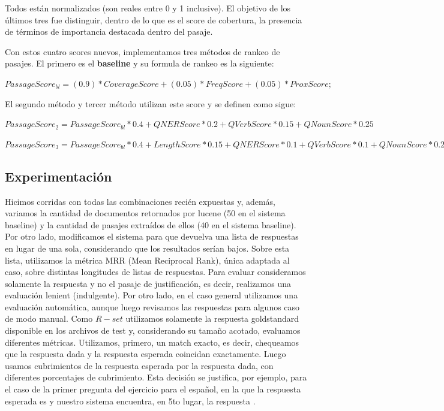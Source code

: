 Todos están normalizados (son reales entre 0 y 1 inclusive). El objetivo de los últimos tres fue distinguir, dentro de lo que es el score de cobertura, la presencia de términos de importancia destacada dentro del pasaje.


Con estos cuatro scores nuevos, implementamos tres métodos de rankeo de pasajes. El primero es el \textbf{baseline} y su formula de rankeo es la siguiente: \newline

$PassageScore_{bl} = (0.9)*CoverageScore + (0.05)*FreqScore+ (0.05)*ProxScore;$ \newline

El segundo método y tercer método utilizan este score y se definen como sigue:\newline

$PassageScore_2 =  PassageScore_{bl} * 0.4 + QNERScore * 0.2 + QVerbScore*0.15	+ QNounScore * 0.25 $\newline

$PassageScore_3 =  PassageScore_{bl} * 0.4 + LengthScore * 0.15 + QNERScore * 0.1 + QVerbScore*0.1	+ QNounScore * 0.25 $\newline


\subsection{Experimentación}
\label{sec:eval}

Hicimos corridas con todas las combinaciones recién expuestas y, además, variamos la cantidad de documentos retornados por lucene (50 en el sistema baseline) y la cantidad de pasajes extraídos de ellos (40 en el sistema baseline).  Por otro lado, modificamos el sistema para que devuelva una lista de respuestas en lugar de una sola, considerando que los resultados serían bajos. Sobre esta lista, utilizamos la métrica MRR (Mean Reciprocal Rank), única adaptada al caso, sobre distintas longitudes de listas de respuestas. Para evaluar consideramos solamente la respuesta y no el pasaje de justificación, es decir, realizamos una evaluación lenient (indulgente). Por otro lado, en el caso general utilizamos una evaluación automática, aunque luego revisamos las respuestas para algunos caso de modo manual. Como $R-set$ utilizamos solamente la respuesta goldstandard disponible en los archivos de test y, considerando su tamaño acotado, evaluamos diferentes métricas. Utilizamos, primero, un match exacto, es decir, chequeamos que la respuesta dada y la respuesta esperada coincidan exactamente. Luego usamos cubrimientos de la respuesta esperada por la respuesta dada, con diferentes porcentajes de cubrimiento. Esta decisión se justifica, por ejemplo, para el caso de la primer pregunta del ejercicio para el español, en la que la respuesta esperada es  y nuestro sistema encuentra, en 5to lugar, la respuesta .

